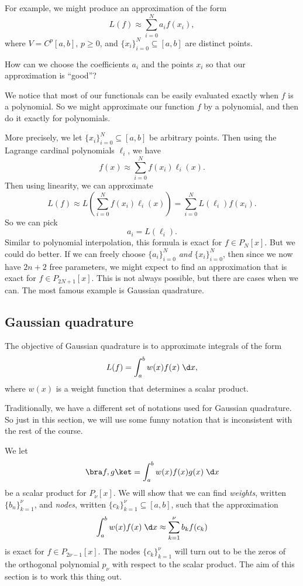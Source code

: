 \documentclass[a4paper]{article}
\begin{document}
For example, we might produce an approximation of the form
\[
  L(f) \approx \sum_{i = 0}^N a_i f(x_i),
\]
where $V = C^p[a, b]$, $p \geq 0$, and $\{x_i\}_{i = 0}^N \subseteq [a, b]$ are distinct points.

How can we choose the coefficients $a_i$ and the points $x_i$ so that our approximation is ``good''?

We notice that most of our functionals can be easily evaluated exactly when $f$ is a polynomial. So we might approximate our function $f$ by a polynomial, and then do it exactly for polynomials.

More precisely, we let $ \{x_i\}_{i = 0}^N \subseteq [a, b]$ be arbitrary points. Then using the Lagrange cardinal polynomials $\ell_i$, we have
\[
  f(x) \approx \sum_{i = 0}^N f(x_i) \ell_i(x).
\]
Then using linearity, we can approximate
\[
  L(f) \approx L\left(\sum_{i = 0}^N f(x_i) \ell_i(x)\right) = \sum_{i = 0}^N L(\ell_i) f(x_i).
\]
So we can pick
\[
  a_i = L(\ell_i).
\]
Similar to polynomial interpolation, this formula is exact for $f \in P_N[x]$. But we could do better. If we can freely choose $\{a_i\}_{i = 0}^N$ \emph{and} $\{x_i\}_{i = 0}^N$, then since we now have $2n + 2$ free parameters, we might expect to find an approximation that is exact for $f \in P_{2N + 1}[x]$. This is not always possible, but there are cases when we can. The most famous example is Gaussian quadrature.

\subsection{Gaussian quadrature}
The objective of Gaussian quadrature is to approximate integrals of the form
\[
  L(f) = \int_a^b w(x) f(x)\;\d x,
\]
where $w(x)$ is a weight function that determines a scalar product.

Traditionally, we have a different set of notations used for Gaussian quadrature. So just in this section, we will use some funny notation that is inconsistent with the rest of the course.

We let
\[
  \bra f, g\ket = \int_a^b w(x) f(x)g(x)\;\d x
\]
be a scalar product for $P_\nu[x]$. We will show that we can find \emph{weights}, written $\{b_n\}_{k = 1}^\nu$, and \emph{nodes}, written $\{c_k\}_{k = 1}^\nu \subseteq [a, b]$, such that the approximation
\[
  \int_a^b w(x) f(x)\;\d x \approx \sum_{k = 1}^{\nu} b_k f(c_k)
\]
is exact for $f \in P_{2\nu - 1}[x]$. The nodes $\{c_k\}_{k = 1}^{\nu}$ will turn out to be the zeros of the orthogonal polynomial $p_\nu$ with respect to the scalar product. The aim of this section is to work this thing out.
\end{document}
